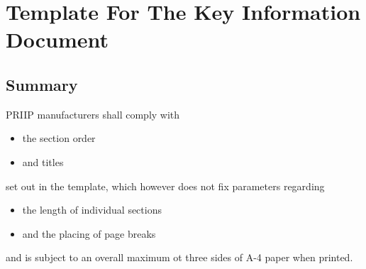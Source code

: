\chapter{Template For The Key Information Document}

\section{Summary}
PRIIP manufacturers shall comply with
\begin{itemize}
	\item the section order
	\item and titles
\end{itemize}
set out in the template, which however does not fix parameters regarding
\begin{itemize}
	\item the length of individual sections
	\item and the placing of page breaks
\end{itemize}
and is subject to an overall maximum ot three sides of A-4 paper when printed.